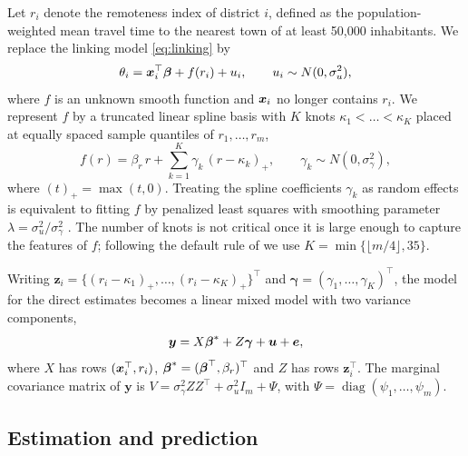Let $r_i$ denote the remoteness index of district $i$, defined as the
population-weighted mean travel time to the nearest town of at least 50{,}000
inhabitants. We replace the linking model \eqref{eq:linking} by
\begin{equation}
  \theta_i = \boldsymbol{x}_i^\top \boldsymbol{\beta} + f(r_i) + u_i, \qquad u_i \sim N(0, \sigma_u^2),
  \label{eq:safh}
\end{equation}
where $f$ is an unknown smooth function and $\boldsymbol{x}_i$ no longer contains $r_i$.
We represent $f$ by a truncated linear spline basis with $K$ knots
$\kappa_1 < \dots < \kappa_K$ placed at equally spaced sample quantiles of
$r_1, \dots, r_m$,
\begin{equation}
  f(r) = \beta_r\, r + \sum_{k=1}^{K} \gamma_k\, (r - \kappa_k)_+,
  \qquad \gamma_k \sim N(0, \sigma_\gamma^2),
  \label{eq:spline}
\end{equation}
where $(t)_+ = \max(t, 0)$. Treating the spline coefficients $\gamma_k$ as
random effects is equivalent to fitting $f$ by penalized least squares with
smoothing parameter $\lambda = \sigma_u^2 / \sigma_\gamma^2$
\citep{ruppert2003semiparametric}. The number of knots is not critical once it
is large enough to capture the features of $f$; following the default rule of
\citet{ruppert2002selecting} we use $K = \min\{\lfloor m/4 \rfloor, 35\}$.

Writing $\boldsymbol{z}_i = \{(r_i - \kappa_1)_+, \dots, (r_i - \kappa_K)_+\}^\top$
and $\boldsymbol{\gamma} = (\gamma_1, \dots, \gamma_K)^\top$, the model for the
direct estimates becomes a linear mixed model with two variance components,
\begin{equation}
  \boldsymbol{y} = X \boldsymbol{\beta}^{*} + Z \boldsymbol{\gamma} + \boldsymbol{u} + \boldsymbol{e},
  \label{eq:lmm}
\end{equation}
where $X$ has rows $(\boldsymbol{x}_i^\top, r_i)$, $\boldsymbol{\beta}^{*} = (\boldsymbol{\beta}^\top, \beta_r)^\top$
and $Z$ has rows $\boldsymbol{z}_i^\top$. The marginal covariance matrix of
$\boldsymbol{y}$ is
$V = \sigma_\gamma^2 Z Z^\top + \sigma_u^2 I_m + \Psi$, with
$\Psi = \operatorname{diag}(\psi_1, \dots, \psi_m)$.

\subsection{Estimation and prediction}
\label{sec:estimation}

